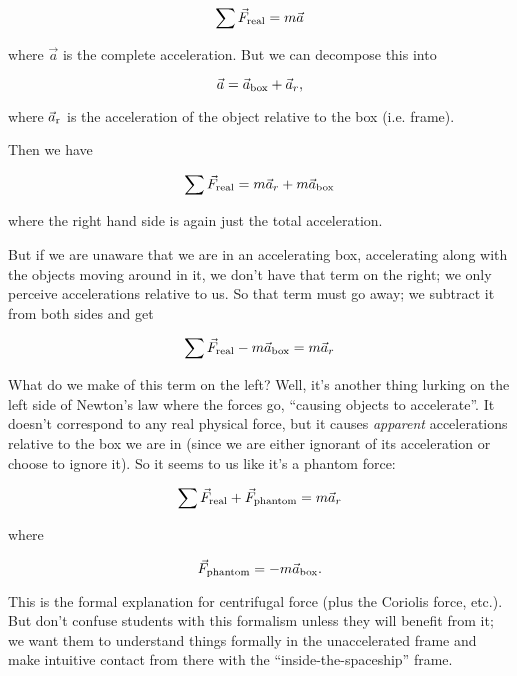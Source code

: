 \documentclass[12pt]{article}
\begin{document}
{$$\sum \vec F_{\rm real} = m \vec a$$

where $\vec a$ is the complete acceleration. But we can decompose this into 

$$\vec a = \vec a_{\rm box} + \vec a_{r},$$

 where $\vec a_{\rm r}$ is the acceleration of the object relative to the box (i.e. frame).

Then we have 

$$\sum \vec F_{\rm real} = m \vec a_r + m \vec a_{\rm box}$$

where the right hand side is again just the total acceleration.

But if we are unaware that we are in an accelerating box, accelerating along with the objects moving around in it, we don't have that term on the right; we only perceive accelerations relative to us. So that term must go away; we subtract it from both sides and get

$$\sum \vec F_{\rm real} - m \vec a_{\rm box} = m \vec a_r $$

What do we make of this term on the left? Well, it's another thing lurking on the left side of Newton's law where the forces go, ``causing objects to accelerate''. It doesn't correspond to any real physical force, but it causes {\it apparent} accelerations relative to the box we are in (since we are either ignorant of its acceleration or choose to ignore it). So it seems to us like it's a phantom force:


$$\sum \vec F_{\rm real} + \vec F_{\rm phantom} = m \vec a_r $$

where

$$\vec F_{\rm phantom} = -m \vec a_{\rm box}.$$

This is the formal explanation for centrifugal force (plus the Coriolis force, etc.). But don't confuse students with this formalism unless they will benefit from it; we want them to understand things formally in the unaccelerated frame and make intuitive contact from there with the ``inside-the-spaceship'' frame.

}
\end{document}
